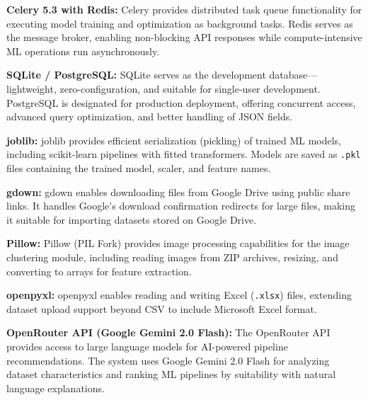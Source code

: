\documentclass[12pt,a4paper]{report}
\begin{document}
\vspace{0.4cm}

\textbf{Celery 5.3 with Redis:}
Celery provides distributed task queue functionality for executing model training and optimization as background tasks. Redis serves as the message broker, enabling non-blocking API responses while compute-intensive ML operations run asynchronously.

\vspace{0.4cm}

\textbf{SQLite / PostgreSQL:}
SQLite serves as the development database—lightweight, zero-configuration, and suitable for single-user development. PostgreSQL is designated for production deployment, offering concurrent access, advanced query optimization, and better handling of JSON fields.

\vspace{0.4cm}

\textbf{joblib:}
joblib provides efficient serialization (pickling) of trained ML models, including scikit-learn pipelines with fitted transformers. Models are saved as \texttt{.pkl} files containing the trained model, scaler, and feature names.

\vspace{0.4cm}

\textbf{gdown:}
gdown enables downloading files from Google Drive using public share links. It handles Google's download confirmation redirects for large files, making it suitable for importing datasets stored on Google Drive.

\vspace{0.4cm}

\textbf{Pillow:}
Pillow (PIL Fork) provides image processing capabilities for the image clustering module, including reading images from ZIP archives, resizing, and converting to arrays for feature extraction.

\vspace{0.4cm}

\textbf{openpyxl:}
openpyxl enables reading and writing Excel (\texttt{.xlsx}) files, extending dataset upload support beyond CSV to include Microsoft Excel format.

\vspace{0.4cm}

\textbf{OpenRouter API (Google Gemini 2.0 Flash):}
The OpenRouter API provides access to large language models for AI-powered pipeline recommendations. The system uses Google Gemini 2.0 Flash for analyzing dataset characteristics and ranking ML pipelines by suitability with natural language explanations.
\end{document}
